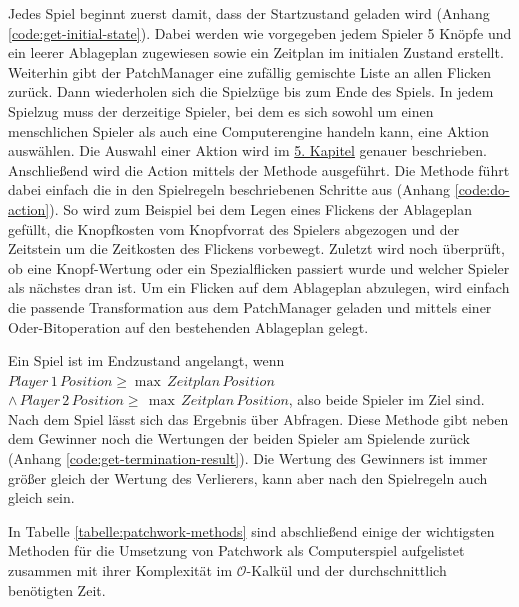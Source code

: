 Jedes Spiel beginnt zuerst damit, dass der Startzustand geladen wird (Anhang \ref{code:get-initial-state}). Dabei werden wie vorgegeben jedem Spieler 5 Knöpfe und ein leerer Ablageplan zugewiesen sowie ein Zeitplan im initialen Zustand erstellt. Weiterhin gibt der PatchManager eine zufällig gemischte Liste an allen Flicken zurück. Dann wiederholen sich die Spielzüge bis zum Ende des Spiels. In jedem Spielzug muss der derzeitige Spieler, bei dem es sich sowohl um einen menschlichen Spieler als auch eine Computerengine handeln kann, eine Aktion auswählen. Die Auswahl einer Aktion wird im \hyperref[chapter:erstellung-der-computerspielengines]{5. Kapitel} genauer beschrieben. Anschließend wird die Action mittels der Methode  ausgeführt. Die Methode führt dabei einfach die in den Spielregeln beschriebenen Schritte aus (Anhang \ref{code:do-action}). So wird zum Beispiel bei dem Legen eines Flickens der Ablageplan gefüllt, die Knopfkosten vom Knopfvorrat des Spielers abgezogen und der Zeitstein um die Zeitkosten des Flickens vorbewegt. Zuletzt wird noch überprüft, ob eine Knopf-Wertung oder ein Spezialflicken passiert wurde und welcher Spieler als nächstes dran ist. Um ein Flicken auf dem Ablageplan abzulegen, wird einfach die passende Transformation aus dem PatchManager geladen und mittels einer Oder-Bitoperation auf den bestehenden Ablageplan gelegt.

Ein Spiel ist im Endzustand angelangt, wenn $Player\, 1\, Position \ge \max\, Zeitplan\, Position$ $\wedge\, Player\, 2\, Position \ge\, \max\, Zeitplan\, Position$, also beide Spieler im Ziel sind. Nach dem Spiel lässt sich das Ergebnis über  Abfragen. Diese Methode gibt neben dem Gewinner noch die Wertungen der beiden Spieler am Spielende zurück (Anhang \ref{code:get-termination-result}). Die Wertung des Gewinners ist immer größer gleich der Wertung des Verlierers, kann aber nach den Spielregeln auch gleich sein.

In Tabelle \ref{tabelle:patchwork-methods} sind abschließend einige der wichtigsten Methoden für die Umsetzung von Patchwork als Computerspiel aufgelistet zusammen mit ihrer Komplexität im $\mathcal{O}$-Kalkül und der durchschnittlich benötigten Zeit.

